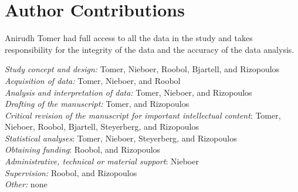 \section*{Author Contributions}
Anirudh Tomer had full access to all the data in the study and takes responsibility for the integrity of the data and the accuracy of the data analysis.

\textit{Study concept and design:} Tomer, Nieboer, Roobol, Bjartell, and Rizopoulos\\
\textit{Acquisition of data:} Tomer, Nieboer, and Roobol\\
\textit{Analysis and interpretation of data:} Tomer, Nieboer, and Rizopoulos\\
\textit{Drafting of the manuscript:} Tomer, and Rizopoulos\\
\textit{Critical revision of the manuscript for important intellectual content}: Tomer, Nieboer, Roobol, Bjartell, Steyerberg, and Rizopoulos\\
\textit{Statistical analyses}: Tomer, Nieboer, Steyerberg, and Rizopoulos\\
\textit{Obtaining funding}: Roobol, and Rizopoulos\\
\textit{Administrative, technical or material support}: Nieboer\\
\textit{Supervision:} Roobol, and Rizopoulos\\
\textit{Other:} none